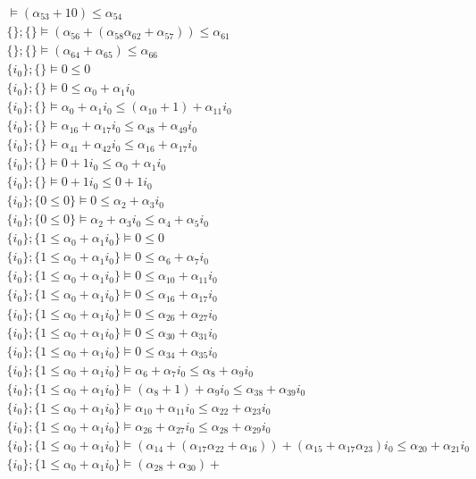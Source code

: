 {\begin{align*}
\vDash (\alpha_{53}+10) \leq \alpha_{54}\\ \{\};\{\}  \vDash (\alpha_{56}+(\alpha_{58}\alpha_{62}+\alpha_{57})) \leq \alpha_{61}\\ \{\};\{\}  \vDash (\alpha_{64}+\alpha_{65}) \leq \alpha_{66}\\ \{i_{0}\};\{\}  \vDash 0 \leq 0\\ \{i_{0}\};\{\}  \vDash 0 \leq \alpha_{0} + \alpha_{1}i_{0}\\ \{i_{0}\};\{\}  \vDash \alpha_{0} + \alpha_{1}i_{0} \leq (\alpha_{10}+1) + \alpha_{11}i_{0}\\ \{i_{0}\};\{\}  \vDash \alpha_{16} + \alpha_{17}i_{0} \leq \alpha_{48} + \alpha_{49}i_{0}\\ \{i_{0}\};\{\}  \vDash \alpha_{41} + \alpha_{42}i_{0} \leq \alpha_{16} + \alpha_{17}i_{0}\\ \{i_{0}\};\{\}  \vDash 0 + 1i_{0} \leq \alpha_{0} + \alpha_{1}i_{0}\\ \{i_{0}\};\{\}  \vDash 0 + 1i_{0} \leq 0 + 1i_{0}\\ \{i_{0}\};\{0 \leq 0\}  \vDash 0 \leq \alpha_{2} + \alpha_{3}i_{0}\\ \{i_{0}\};\{0 \leq 0\}  \vDash \alpha_{2} + \alpha_{3}i_{0} \leq \alpha_{4} + \alpha_{5}i_{0}\\ \{i_{0}\};\{1 \leq \alpha_{0} + \alpha_{1}i_{0}\}  \vDash 0 \leq 0\\ \{i_{0}\};\{1 \leq \alpha_{0} + \alpha_{1}i_{0}\}  \vDash 0 \leq \alpha_{6} + \alpha_{7}i_{0}\\ \{i_{0}\};\{1 \leq \alpha_{0} + \alpha_{1}i_{0}\}  \vDash 0 \leq \alpha_{10} + \alpha_{11}i_{0}\\ \{i_{0}\};\{1 \leq \alpha_{0} + \alpha_{1}i_{0}\}  \vDash 0 \leq \alpha_{16} + \alpha_{17}i_{0}\\ \{i_{0}\};\{1 \leq \alpha_{0} + \alpha_{1}i_{0}\}  \vDash 0 \leq \alpha_{26} + \alpha_{27}i_{0}\\ \{i_{0}\};\{1 \leq \alpha_{0} + \alpha_{1}i_{0}\}  \vDash 0 \leq \alpha_{30} + \alpha_{31}i_{0}\\ \{i_{0}\};\{1 \leq \alpha_{0} + \alpha_{1}i_{0}\}  \vDash 0 \leq \alpha_{34} + \alpha_{35}i_{0}\\ \{i_{0}\};\{1 \leq \alpha_{0} + \alpha_{1}i_{0}\}  \vDash \alpha_{6} + \alpha_{7}i_{0} \leq \alpha_{8} + \alpha_{9}i_{0}\\ \{i_{0}\};\{1 \leq \alpha_{0} + \alpha_{1}i_{0}\}  \vDash (\alpha_{8}+1) + \alpha_{9}i_{0} \leq \alpha_{38} + \alpha_{39}i_{0}\\ \{i_{0}\};\{1 \leq \alpha_{0} + \alpha_{1}i_{0}\}  \vDash \alpha_{10} + \alpha_{11}i_{0} \leq \alpha_{22} + \alpha_{23}i_{0}\\ \{i_{0}\};\{1 \leq \alpha_{0} + \alpha_{1}i_{0}\}  \vDash \alpha_{26} + \alpha_{27}i_{0} \leq \alpha_{28} + \alpha_{29}i_{0}\\ \{i_{0}\};\{1 \leq \alpha_{0} + \alpha_{1}i_{0}\}  \vDash (\alpha_{14}+(\alpha_{17}\alpha_{22}+\alpha_{16})) + (\alpha_{15}+\alpha_{17}\alpha_{23})i_{0} \leq \alpha_{20} + \alpha_{21}i_{0}\\ \{i_{0}\};\{1 \leq \alpha_{0} + \alpha_{1}i_{0}\}  \vDash (\alpha_{28}+\alpha_{30}) + 
\end{align*}}
